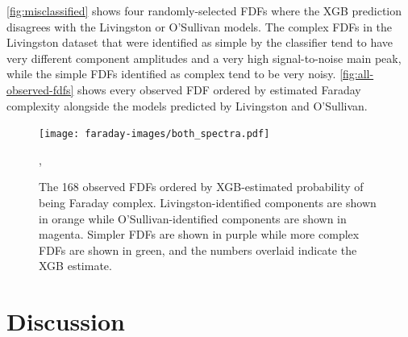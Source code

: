     \autoref{fig:misclassified} shows four randomly-selected FDFs where the XGB prediction disagrees with the Livingston or O'Sullivan models. The complex FDFs in the Livingston dataset that were identified as simple by the classifier tend to have very different component amplitudes and a very high signal-to-noise main peak, while the simple FDFs identified as complex tend to be very noisy. \autoref{fig:all-observed-fdfs} shows every observed FDF ordered by estimated Faraday complexity alongside the models predicted by Livingston and O'Sullivan.

    \begin{figure}
      \centering
      \texttt{[image: faraday-images/both\_spectra.pdf]}
      \caption{The 168 observed FDFs ordered by XGB-estimated probability of being Faraday complex. Livingston-identified components are shown in orange while O'Sullivan-identified components are shown in magenta. Simpler FDFs are shown in purple while more complex FDFs are shown in green, and the numbers overlaid indicate the XGB estimate.},
      \label{fig:faraday-all-observed-fdfs}
    \end{figure}

\section{Discussion}
\label{sec:faraday-discussion}

